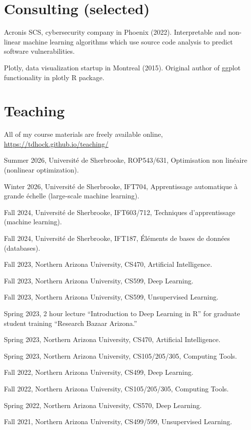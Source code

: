 \documentclass[margin,line]{res}
\begin{document}
\begin{resume}
\section{\sc Consulting (selected)}

Acronis SCS, cybersecurity company in Phoenix (2022). Interpretable
and non-linear machine learning algorithms which use source code
analysis to predict software vulnerabilities.

Plotly, data visualization startup in Montreal (2015). Original author
of ggplot functionality in plotly R package.

\section{\sc Teaching}

All of my course materials are freely available online,
\url{https://tdhock.github.io/teaching/}

Summer 2026, Université de Sherbrooke, ROP543/631, Optimisation non linéaire (nonlinear optimization).

Winter 2026, Université de Sherbrooke, IFT704, Apprentissage automatique à grande échelle (large-scale machine learning).

Fall 2024, Université de Sherbrooke, IFT603/712, Techniques d’apprentissage (machine learning).

Fall 2024, Université de Sherbrooke, IFT187, Éléments de bases de données (databases).

Fall 2023, Northern Arizona University, CS470, Artificial Intelligence.

Fall 2023, Northern Arizona University, CS599, Deep Learning.

Fall 2023, Northern Arizona University, CS599, Unsupervised Learning.

Spring 2023, 2 hour lecture ``Introduction to Deep Learning in R'' for
graduate student training ``Research Bazaar Arizona.''

Spring 2023, Northern Arizona University, CS470, Artificial Intelligence.

Spring 2023, Northern Arizona University, CS105/205/305, Computing Tools.

Fall 2022, Northern Arizona University, CS499, Deep Learning.

Fall 2022, Northern Arizona University, CS105/205/305, Computing Tools.

Spring 2022, Northern Arizona University, CS570, Deep Learning.

Fall 2021, Northern Arizona University, CS499/599, Unsupervised Learning.


\end{resume}
\end{document}
